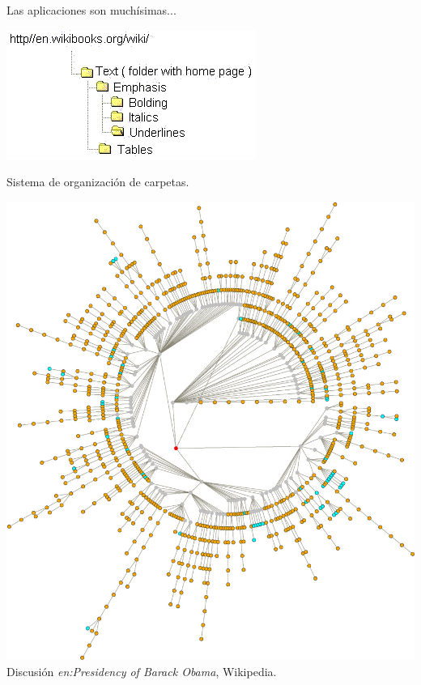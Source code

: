 \documentclass[handout]{beamer} %
\begin{document}
\begin{frame}{Las aplicaciones son muchísimas...}
    \begin{minipage}{0.43\textwidth}
    \begin{center}
        \includegraphics[width=\textwidth]{./image/cap3/folders-tree}
    \end{center}
    {\scriptsize Sistema de organización de carpetas.}
    \end{minipage}
    \begin{minipage}{0.55\textwidth}
    \begin{center}
        \includegraphics[width=.9\textwidth]{./image/cap3/Obama-tree.jpg}\\
    {\tiny Discusión {\em en:Presidency of Barack Obama}, Wikipedia.}
    \end{center}
    \end{minipage}
\end{frame}
\end{document}
